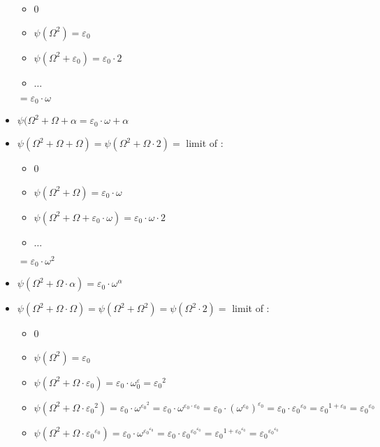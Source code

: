 \documentclass[10pt]{article}
\begin{document}
\begin{itemize}
   \begin{itemize}
     \setlength{\itemsep}{1pt}
     \setlength{\parskip}{0pt}
     \setlength{\parsep}{0pt}
   \item 0
   \item \( \psi(\Omega^2)=\varepsilon_0 \)
   \item \( \psi(\Omega^2+\varepsilon_0) = \varepsilon_0 \cdot 2 \)
   \item \( \ldots \)
   \end{itemize}
   \( = \varepsilon_0 \cdot \omega \)
\item \( \psi(\Omega^2+\Omega+\alpha = \varepsilon_0 \cdot \omega + \alpha \)
\item \( \psi(\Omega^2+\Omega+\Omega) = \psi(\Omega^2+\Omega \cdot 2) = \) limit of : 
   \begin{itemize}
     \setlength{\itemsep}{1pt}
     \setlength{\parskip}{0pt}
     \setlength{\parsep}{0pt}
   \item 0
   \item \( \psi(\Omega^2+\Omega) = \varepsilon_0 \cdot \omega \)
   \item \( \psi(\Omega^2+\Omega+\varepsilon_0 \cdot \omega) = \varepsilon_0 \cdot \omega \cdot 2 \)
   \item \( \ldots \)
   \end{itemize}
   \( = \varepsilon_0 \cdot \omega^2 \)
\item \( \psi(\Omega^2+\Omega \cdot \alpha) = \varepsilon_0 \cdot \omega^\alpha \)
\item \( \psi(\Omega^2+\Omega \cdot \Omega) = \psi(\Omega^2+\Omega^2) = \psi(\Omega^2 \cdot 2) = \) limit of :
   \begin{itemize}
     \setlength{\itemsep}{1pt}
     \setlength{\parskip}{0pt}
     \setlength{\parsep}{0pt}
   \item 0
   \item \( \psi(\Omega^2) = \varepsilon_0 \)
   \item \( \psi(\Omega^2+\Omega \cdot \varepsilon_0) = \varepsilon_0 \cdot \omega^\varepsilon_0 = {\varepsilon_0}^2 \)
   \item \( \psi(\Omega^2+\Omega \cdot {\varepsilon_0}^2) = \varepsilon_0 \cdot \omega^{{\varepsilon_0}^2} = \varepsilon_0 \cdot \omega^{\varepsilon_0 \cdot \varepsilon_0} = \varepsilon_0 \cdot (\omega^{\varepsilon_0})^{\varepsilon_0} = \varepsilon_0 \cdot {\varepsilon_0}^{\varepsilon_0} = {\varepsilon_0}^{1+\varepsilon_0} = {\varepsilon_0}^{\varepsilon_0} \)
   \item \( \psi(\Omega^2+\Omega \cdot {\varepsilon_0}^{\varepsilon_0}) = \varepsilon_0 \cdot \omega^{{\varepsilon_0}^{\varepsilon_0}} = \varepsilon_0 \cdot {\varepsilon_0}^{{\varepsilon_0}^{\varepsilon_0}} = {\varepsilon_0}^{1+{\varepsilon_0}^{\varepsilon_0}} = {\varepsilon_0}^{{\varepsilon_0}^{\varepsilon_0}} \) 

\end{itemize}
\end{itemize}
\end{document}
